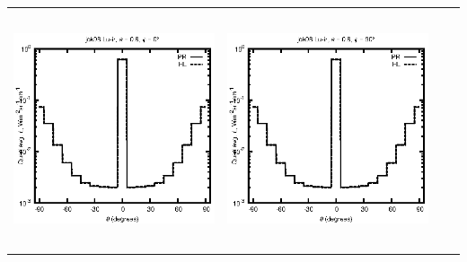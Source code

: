 \begin{tabular}{c c c c}
\includegraphics[height=7cm]{../eps/jok06_Lu_ir_fwd.eps} &
\includegraphics[height=7cm]{../eps/jok06_Lu_ir_cross.eps} \\
\end{tabular}

\pagebreak

